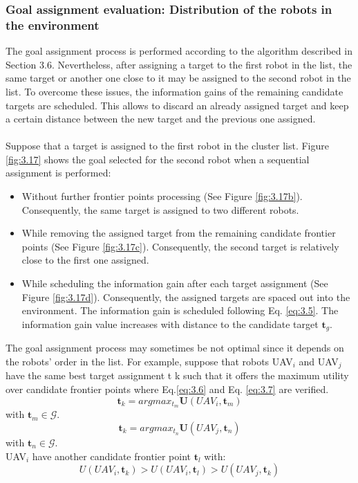 \documentclass[11pt,openany]{book}
\begin{document}
\subsubsection{Goal assignment evaluation: Distribution of the robots in the environment}
The goal assignment process is performed according to the algorithm described in Section 3.6. Nevertheless, after assigning a target to the first robot in the list, the same target or another one close to it may be assigned to the second robot in the list. To overcome these issues, the information gains of the remaining candidate targets are scheduled. This allows to discard an already assigned target and keep a certain distance between the new target and the previous one assigned.\\\\
Suppose that a target is assigned to the first robot in the cluster list. Figure \ref{fig:3.17} shows the goal selected for the second robot when a sequential assignment is performed:
\begin{itemize}
    \item Without further frontier points processing (See Figure \ref{fig:3.17b}). Consequently, the same target is assigned to two different robots.
    \item While removing the assigned target from the remaining candidate frontier points (See Figure \ref{fig:3.17c}). Consequently, the second target is relatively close to the first one assigned.
    \item While scheduling the information gain after each target assignment (See Figure \ref{fig:3.17d}). Consequently, the assigned targets are spaced out into the environment. The information gain is scheduled following Eq. \ref{eq:3.5}. The information gain value increases with distance to the candidate target $\mathbf{t}_g$.
\end{itemize}
The goal assignment process may sometimes be not optimal since it depends on the robots’ order in the list. For example, suppose that robots UAV$_i$ and UAV$_j$ have the same best target assignment t k such that it offers the maximum utility over candidate frontier points where Eq.\ref{eq:3.6} and Eq. \ref{eq:3.7} are verified.
\begin{equation}\label{eq:3.6}
    \mathbf{t}_k=argmax_{t_m}\mathbf{U}(UAV_i,\mathbf{t}_m)
\end{equation}
with $\mathbf{t}_m \in \mathcal{G}$.
\begin{equation}\label{eq:3.7}
    \mathbf{t}_k=argmax_{t_n}\mathbf{U}(UAV_j, \mathbf{t}_n)
\end{equation}
with $\mathbf{t}_n \in \mathcal{G}$.\\
UAV$_i$ have another candidate frontier point $\mathbf{t}_l$ with:
\begin{equation}\label{eq:3.8}
    \mathbf{\mathit{U}}(UAV_i, \mathbf{t}_k) > \mathbf{\mathit{U}}(UAV_i,\mathbf{t}_l) > \mathbf{\mathit{U}}(UAV_j, \mathbf{t}_k)
\end{equation}
\end{document}
